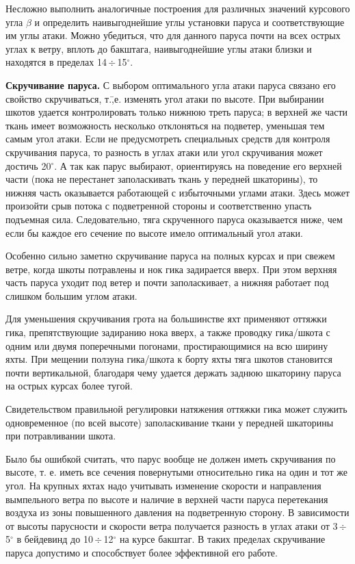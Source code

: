 \documentclass[a4paper, 12pt, twoside, final, book, russian, fittopage, cyremdash]{ncc}
\newcommand{\gr}{\ensuremath{^\circ}\xspace}
\newcommand{\otdo}{\,\ensuremath{\div}\,}
\begin{document}
Несложно выполнить аналогичные построения для различных значений курсового угла $\beta$ и определить наивыгоднейшие углы установки паруса и соответствующие им углы атаки. Можно убедиться, что для данного паруса почти на всех острых углах к ветру, вплоть до бакштага, наивыгоднейшие углы атаки близки и находятся в пределах 14\otdo 15\gr.

\textbf{Скручивание паруса.} С выбором оптимального угла атаки паруса связано его свойство скручиваться, т.\=,е. изменять угол атаки по высоте. При выбирании шкотов удается контролировать только нижнюю треть паруса; в верхней же части ткань имеет возможность несколько отклоняться на подветер, уменьшая тем самым угол атаки. Если не предусмотреть специальных средств для контроля скручивания паруса, то разность в углах атаки или угол скручивания может достичь 20\gr. А так как парус выбирают, ориентируясь на поведение его верхней части (пока не перестанет заполаскивать ткань у передней шкаторины), то нижняя часть оказывается работающей с избыточными углами атаки. Здесь может произойти срыв потока с подветренной стороны и соответственно упасть подъемная сила. Следовательно, тяга скрученного паруса оказывается ниже, чем если бы каждое его сечение по высоте имело оптимальный угол атаки. 

Особенно сильно заметно скручивание паруса на полных курсах и при свежем ветре, когда шкоты потравлены и нок гика задирается вверх. При этом верхняя часть паруса уходит под ветер и почти заполаскивает, а нижняя работает под слишком большим углом атаки. 

Для уменьшения скручивания грота на большинстве яхт применяют оттяжки гика, препятствующие задиранию нока вверх, а также проводку гика\-/шкота с одним или двумя поперечными погонами, простирающимися на всю ширину яхты. При мещении ползуна гика\-/шкота к борту яхты тяга шкотов становится почти вертикальной, благодаря чему удается держать заднюю шкаторину паруса на острых курсах более тугой. 

Свидетельством правильной регулировки натяжения оттяжки гика может служить одновременное (по всей высоте) заполаскивание ткани у передней шкаторины при потравливании шкота.

Было бы ошибкой считать, что парус вообще не должен иметь скручивания по высоте, т. е. иметь все сечения повернутыми относительно гика на один и тот же угол. На крупных яхтах надо учитывать изменение скорости и направления вымпельного ветра по высоте и наличие в верхней части паруса перетекания воздуха из зоны повышенного давления на подветренную сторону. В зависимости от высоты парусности и скорости ветра получается разность в углах атаки от 3\otdo 5\gr в бейдевинд до 10\otdo 12\gr на курсе бакштаг. В таких пределах скручивание паруса допустимо и способствует более эффективной его работе. 
\end{document}
